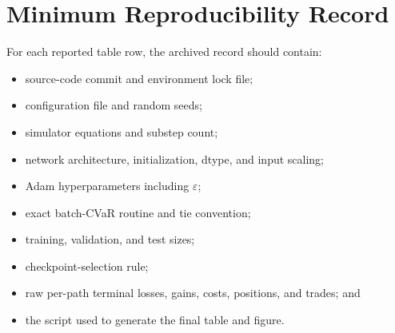 \section{Minimum Reproducibility Record}

For each reported table row, the archived record should contain:

\begin{itemize}[leftmargin=2em]
  \item source-code commit and environment lock file;
  \item configuration file and random seeds;
  \item simulator equations and substep count;
  \item network architecture, initialization, dtype, and input scaling;
  \item Adam hyperparameters including $\varepsilon$;
  \item exact batch-CVaR routine and tie convention;
  \item training, validation, and test sizes;
  \item checkpoint-selection rule;
  \item raw per-path terminal losses, gains, costs, positions, and trades; and
  \item the script used to generate the final table and figure.
\end{itemize}
